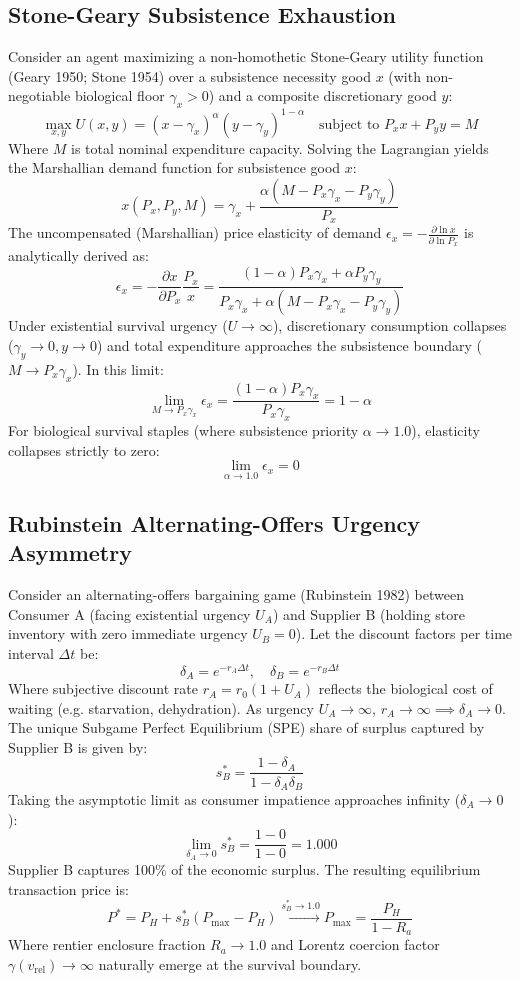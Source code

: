 \documentclass[preprint,12pt,authoryear]{elsarticle}
\theoremstyle{definition}
\begin{document}
\subsection{Stone-Geary Subsistence Exhaustion}

Consider an agent maximizing a non-homothetic Stone-Geary utility function (Geary 1950; Stone 1954) over a subsistence necessity good $x$ (with non-negotiable biological floor $\gamma_x > 0$) and a composite discretionary good $y$:  
$$\max_{x, y} U(x, y) = (x - \gamma_x)^{\alpha} (y - \gamma_y)^{1-\alpha} \quad \text{subject to } P_x x + P_y y = M$$  
Where $M$ is total nominal expenditure capacity. Solving the Lagrangian yields the Marshallian demand function for subsistence good $x$:  
$$x(P_x, P_y, M) = \gamma_x + \frac{\alpha (M - P_x \gamma_x - P_y \gamma_y)}{P_x}$$  
The uncompensated (Marshallian) price elasticity of demand $\epsilon_x = -\frac{\partial \ln x}{\partial \ln P_x}$ is analytically derived as:  
$$\epsilon_x = -\frac{\partial x}{\partial P_x} \frac{P_x}{x} = \frac{(1 - \alpha) P_x \gamma_x + \alpha P_y \gamma_y}{P_x \gamma_x + \alpha (M - P_x \gamma_x - P_y \gamma_y)}$$  
Under existential survival urgency ($U \to \infty$), discretionary consumption collapses ($\gamma_y \to 0, y \to 0$) and total expenditure approaches the subsistence boundary ($M \to P_x \gamma_x$). In this limit:  
$$\lim_{M \to P_x \gamma_x} \epsilon_x = \frac{(1 - \alpha) P_x \gamma_x}{P_x \gamma_x} = 1 - \alpha$$  
For biological survival staples (where subsistence priority $\alpha \to 1.0$), elasticity collapses strictly to zero:  
$$\lim_{\alpha \to 1.0} \epsilon_x = 0$$

\subsection{Rubinstein Alternating-Offers Urgency Asymmetry}

Consider an alternating-offers bargaining game (Rubinstein 1982) between Consumer A (facing existential urgency $U_A$) and Supplier B (holding store inventory with zero immediate urgency $U_B = 0$).  
Let the discount factors per time interval $\Delta t$ be:  
$$\delta_A = e^{-r_A \Delta t}, \quad \delta_B = e^{-r_B \Delta t}$$  
Where subjective discount rate $r_A = r_0 (1 + U_A)$ reflects the biological cost of waiting (e.g. starvation, dehydration). As urgency $U_A \to \infty$, $r_A \to \infty \implies \delta_A \to 0$.  
The unique Subgame Perfect Equilibrium (SPE) share of surplus captured by Supplier B is given by:  
$$s_B^* = \frac{1 - \delta_A}{1 - \delta_A \delta_B}$$  
Taking the asymptotic limit as consumer impatience approaches infinity ($\delta_A \to 0$):  
$$\lim_{\delta_A \to 0} s_B^* = \frac{1 - 0}{1 - 0} = 1.000$$  
Supplier B captures 100\% of the economic surplus. The resulting equilibrium transaction price is:  
$$P^* = P_H + s_B^* (P_{\text{max}} - P_H) \xrightarrow{s_B^* \to 1.0} P_{\text{max}} = \frac{P_H}{1 - R_a}$$  
Where rentier enclosure fraction $R_a \to 1.0$ and Lorentz coercion factor $\gamma(v_{\text{rel}}) \to \infty$ naturally emerge at the survival boundary.




\end{document}

